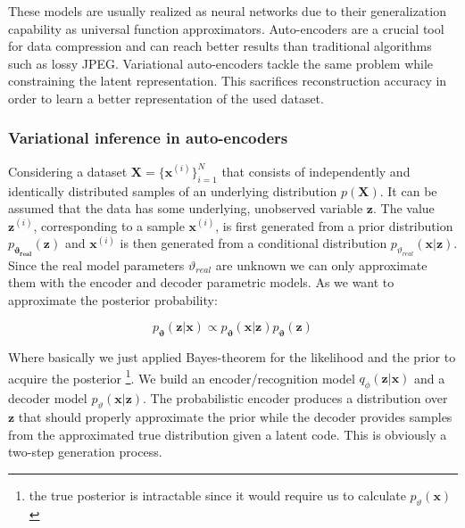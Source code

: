 \documentclass[12pt, english]{article}
\begin{document}
\vspace{4mm}

\par These models are usually realized as neural networks due to their generalization capability as universal function approximators. Auto-encoders are a crucial tool for data compression and can reach better results than traditional algorithms \cite{theis2017lossy} such as lossy JPEG. Variational auto-encoders tackle the same problem while constraining the latent representation. This sacrifices reconstruction accuracy in order to learn a better representation of the used dataset.

\vspace{4mm}

\subsubsection{Variational inference in auto-encoders}

\vspace{4mm}

\par Considering a dataset $\boldsymbol{X} = \big\{\boldsymbol{\bm{x}}^{(i)}\big\}_{i = 1}^{N}$ that consists of independently and identically distributed samples of an underlying distribution $p(\boldsymbol{X})$. It can be assumed that the data has some underlying, unobserved variable $\boldsymbol{\bm{z}}$. The value $\boldsymbol{\bm{z}}^{(i)}$, corresponding to a sample $\boldsymbol{\bm{x}}^{(i)}$, is first generated from a prior distribution $p_{\boldsymbol{\vartheta_{real}}}(\boldsymbol{\bm{z}})$ and $\boldsymbol{\bm{x}}^{(i)}$ is then generated from a conditional distribution $p_{\vartheta_{real}}(\boldsymbol{\bm{x}} | \boldsymbol{\bm{z}})$. Since the real model parameters $\vartheta_{real}$ are unknown we can only approximate them with the encoder and decoder parametric models. As we want to approximate the posterior probability:

\vspace{4mm}

\begin{equation}
    p_{\boldsymbol{\vartheta}}(\boldsymbol{\bm{z}} | \boldsymbol{\bm{x}}) \propto p_{\boldsymbol{\vartheta}}(\boldsymbol{\bm{x}} | \boldsymbol{\bm{z}}) p_{\boldsymbol{\vartheta}}(\boldsymbol{\bm{z}})
\end{equation}

\vspace{4mm}

\par Where basically we just applied Bayes-theorem for the likelihood and the prior to acquire the posterior \footnote{the true posterior is intractable since it would require us to calculate $p_{\vartheta}(\bm{x})$}. We build an encoder/recognition model $q_{\phi}(\boldsymbol{\bm{z}} | \boldsymbol{\bm{x}})$ and a decoder model $p_{\vartheta}(\boldsymbol{\bm{x}} | \boldsymbol{\bm{z}})$. The probabilistic encoder produces a distribution over $\boldsymbol{\bm{z}}$ that should properly approximate the prior while the  decoder provides samples from the approximated true distribution given a latent code. This is obviously a two-step generation process. 
\end{document}
